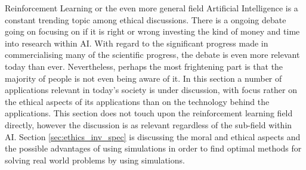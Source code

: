Reinforcement Learning or the even more general field Artificial Intelligence is a constant trending topic among ethical discussions. There is a ongoing debate going on focusing on if it is right or wrong investing the kind of money and time into research within AI. With regard to the significant progress made in commercialising many of the scientific progress, the debate is even more relevant today than ever. Nevertheless, perhaps the most frightening part is that the majority of people is not even being aware of it. In this section a number of applications relevant in today's society is under discussion, with focus rather on the ethical aspects of its applications than on the technology behind the applications. This section does not touch upon the reinforcement learning field directly, however the discussion is as relevant regardless of the sub-field within AI. Section \ref{sec:ethics_inv_spec} is discussing the moral and ethical aspects and the possible advantages of using simulations in order to find optimal methods for solving real world problems by using simulations.
